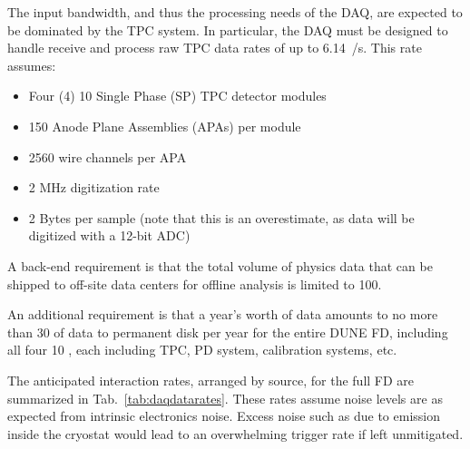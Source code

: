 The input bandwidth, and thus the processing needs of the DAQ, are expected
to be dominated by the TPC system.
In particular, the DAQ must be designed to handle receive and process raw TPC data rates of up to \SI{6.14}{\TB/\s}. This rate assumes:
\begin{itemize}
\item Four (4) \SI{10}{\kton} Single Phase (SP) TPC detector modules
\item 150 Anode Plane Assemblies (APAs) per module
\item 2560 wire channels per APA 
\item 2 MHz digitization rate
\item 2 Bytes per sample (note that this is an overestimate, as data will be digitized with a 12-bit ADC)
\end{itemize}

A back-end requirement is that the total volume of physics data that
can be shipped to off-site data centers for offline analysis is
limited to \SI{100}{\Gbps}.


An additional requirement is that a year's worth of data amounts to no
more than \SI{30}{\PB} of data to permanent disk per year for the
entire DUNE FD, including all four \SI{10}{\kton}
, each including TPC, PD system, calibration
systems, etc.

The anticipated interaction rates, arranged by source, for
the full FD are summarized in Tab.~\ref{tab:daqdatarates}. 
These rates assume noise levels are as expected from intrinsic
electronics noise.
Excess noise such as due to  emission inside the cryostat
would lead to an overwhelming trigger rate if left unmitigated.




